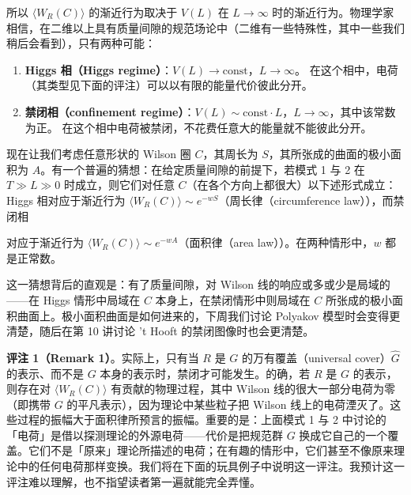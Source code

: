 
所以 $\langle W_R(C)\rangle$ 的渐近行为取决于 $V(L)$ 在 $L\to\infty$ 时的渐近行为。物理学家相信，在二维以上具有质量间隙的规范场论中（二维有一些特殊性，其中一些我们稍后会看到），只有两种可能：

\begin{enumerate}
  \item \textbf{Higgs 相（Higgs regime）}：$V(L)\to\mathrm{const}$，$L\to\infty$。
  在这个相中，电荷（其类型见下面的评注）可以以有限的能量代价彼此分开。
  \item \textbf{禁闭相（confinement regime）}：$V(L)\sim\mathrm{const}\cdot L$，$L\to\infty$，其中该常数为正。
  在这个相中电荷被禁闭，不花费任意大的能量就不能彼此分开。
\end{enumerate}

现在让我们考虑任意形状的 Wilson 圈 $C$，其周长为 $S$，其所张成的曲面的极小面积为 $A$。有一个普遍的猜想：在给定质量间隙的前提下，若模式 1 与 2 在 $T\gg L\gg0$ 时成立，则它们对任意 $C$（在各个方向上都很大）以下述形式成立：Higgs 相对应于渐近行为 $\langle W_R(C)\rangle\sim e^{-wS}$（周长律（circumference law）），而禁闭相

对应于渐近行为 $\langle W_R(C)\rangle\sim e^{-wA}$（面积律（area law））。在两种情形中，$w$ 都是正常数。

这一猜想背后的直观是：有了质量间隙，对 Wilson 线的响应或多或少是局域的——在 Higgs 情形中局域在 $C$ 本身上，在禁闭情形中则局域在 $C$ 所张成的极小面积曲面上。极小面积曲面是如何进来的，下周我们讨论 Polyakov 模型时会变得更清楚，随后在第 10 讲讨论 't Hooft 的禁闭图像时也会更清楚。

\textbf{评注 1（Remark 1）}。实际上，只有当 $R$ 是 $G$ 的万有覆盖（universal cover）$\widehat{G}$ 的表示、而不是 $G$ 本身的表示时，禁闭才可能发生。的确，若 $R$ 是 $G$ 的表示，则存在对 $\langle W_R(C)\rangle$ 有贡献的物理过程，其中 Wilson 线的很大一部分电荷为零（即携带 $G$ 的平凡表示），因为理论中某些粒子把 Wilson 线上的电荷湮灭了。这些过程的振幅大于面积律所预言的振幅。重要的是：上面模式 1 与 2 中讨论的「电荷」是借以探测理论的外源电荷——代价是把规范群 $G$ 换成它自己的一个覆盖。它们不是「原来」理论所描述的电荷；在有趣的情形中，它们甚至不像原来理论中的任何电荷那样变换。我们将在下面的玩具例子中说明这一评注。我预计这一评注难以理解，也不指望读者第一遍就能完全弄懂。

